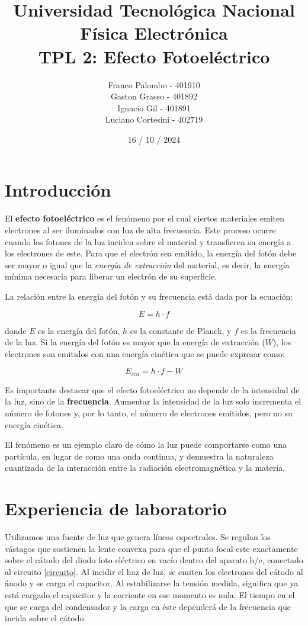 \documentclass[a4paper,12pt]{report}
\title{%
  \fontsize{25}{0}\selectfont Universidad Tecnológica Nacional \\
  \fontsize{22}{30}\selectfont Física Electrónica \\
  \fontsize{18}{25}\selectfont TPL 2: Efecto Fotoeléctrico
}
\author{
Franco Palombo - 401910\\
Gaston Grasso - 401892\\
Ignacio Gil - 401891\\
Luciano Cortesini - 402719\\
}
\date{16 / 10 / 2024}
\begin{document}
\maketitle

\chapter{Introducción}
  El \textbf{efecto fotoeléctrico} es el fenómeno por el cual ciertos materiales emiten electrones al ser iluminados
  con luz de alta frecuencia. Este proceso ocurre cuando los fotones de la luz inciden sobre el material y transfieren
  su energía a los electrones de este. Para que el electrón sea emitido, la energía del fotón debe ser mayor o igual
  que la \textit{energía de extracción} del material, es decir, la energía mínima necesaria para liberar un electrón de
  su superficie.


  La relación entre la energía del fotón y su frecuencia está dada por la ecuación:

  \[
    E = h \cdot f
  \]

  donde \(E\) es la energía del fotón, \(h\) es la constante de Planck, y \(f\) es la frecuencia de la luz. Si la
  energía del fotón es mayor que la energía de extracción (\(W\)), los electrones son emitidos con una energía cinética
  que se puede expresar como:


  \[
    E_{cin} = h \cdot f - W
  \]

  Es importante destacar que el efecto fotoeléctrico no depende de la intensidad de la luz, sino de la
  \textbf{frecuencia}. Aumentar la intensidad de la luz solo incrementa el número de fotones y, por lo tanto, el número
  de electrones emitidos, pero no su energía cinética.

  El fenómeno es un ejemplo claro de cómo la luz puede comportarse como una partícula, en lugar de como una onda
  continua, y demuestra la naturaleza cuantizada de la interacción entre la radiación electromagnética y la materia.

\chapter{Experiencia de laboratorio}
  Utilizamos una fuente de luz que genera líneas espectrales. Se regulan los vástagos que sostienen la lente convexa
  para que el punto focal este exactamente sobre el cátodo del diodo foto eléctrico en vacío dentro del aparato h/e,
  conectado al circuito \ref{circuito}. Al incidir el haz de luz, se emiten los electrones del cátodo al ánodo y se carga el
  capacitor. Al estabilizarse la tensión medida, significa que ya está cargado el capacitor y la corriente en ese
  momento es nula. El tiempo en el que se carga del condensador y la carga en éste dependerá de la frecuencia que
  incida sobre el cátodo.
\end{document}
